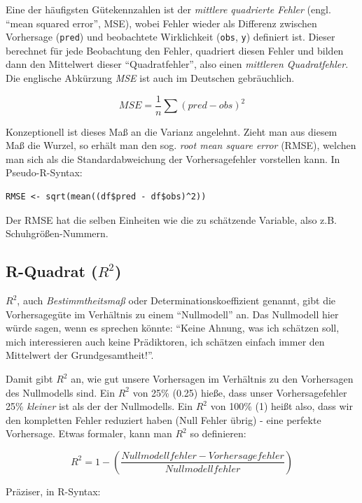 \documentclass[12pt,ngerman,]{book}
\begin{document}
Eine der häufigsten Gütekennzahlen ist der \emph{mittlere quadrierte
Fehler} (engl. ``mean squared error'', MSE), wobei Fehler wieder als
Differenz zwischen Vorhersage (\texttt{pred}) und beobachtete
Wirklichkeit (\texttt{obs}, \texttt{y}) definiert ist. Dieser berechnet
für jede Beobachtung den Fehler, quadriert diesen Fehler und bilden dann
den Mittelwert dieser ``Quadratfehler'', also einen \emph{mittleren
Quadratfehler}. Die englische Abkürzung \emph{MSE} ist auch im Deutschen
gebräuchlich.

\[ MSE = \frac{1}{n} \sum{(pred - obs)^2} \]

Konzeptionell ist dieses Maß an die Varianz angelehnt. Zieht man aus
diesem Maß die Wurzel, so erhält man den sog. \emph{root mean square
error} (RMSE), welchen man sich als die Standardabweichung der
Vorhersagefehler vorstellen kann. In Pseudo-R-Syntax:

\begin{verbatim}
RMSE <- sqrt(mean((df$pred - df$obs)^2))
\end{verbatim}

Der RMSE hat die selben Einheiten wie die zu schätzende Variable, also
z.B. Schuhgrößen-Nummern.

\subsection{\texorpdfstring{R-Quadrat
(\(R^2\))}{R-Quadrat (R\^{}2)}}\label{r-quadrat-r2}

\(R^2\), auch \emph{Bestimmtheitsmaß} oder
Determinationskoeffizient genannt, gibt
die Vorhersagegüte im Verhältnis zu einem
``Nullmodell'' an. Das Nullmodell hier würde sagen, wenn es sprechen
könnte: ``Keine Ahnung, was ich schätzen soll, mich interessieren auch
keine Prädiktoren, ich schätzen einfach immer den Mittelwert der
Grundgesamtheit!''.

Damit gibt \(R^2\) an, wie gut unsere Vorhersagen im Verhältnis zu den
Vorhersagen des Nullmodells sind. Ein \(R^2\) von 25\% (0.25) hieße,
dass unser Vorhersagefehler 25\% \emph{kleiner} ist als der der
Nullmodells. Ein \(R^2\) von 100\% (1) heißt also, dass wir den
kompletten Fehler reduziert haben (Null Fehler übrig) - eine perfekte
Vorhersage. Etwas formaler, kann man \(R^2\) so definieren:

\[ R^2 = 1 - \left( \frac{Nullmodellfehler - Vorhersagefehler}{Nullmodellfehler} \right)\]

Präziser, in R-Syntax:
\end{document}
